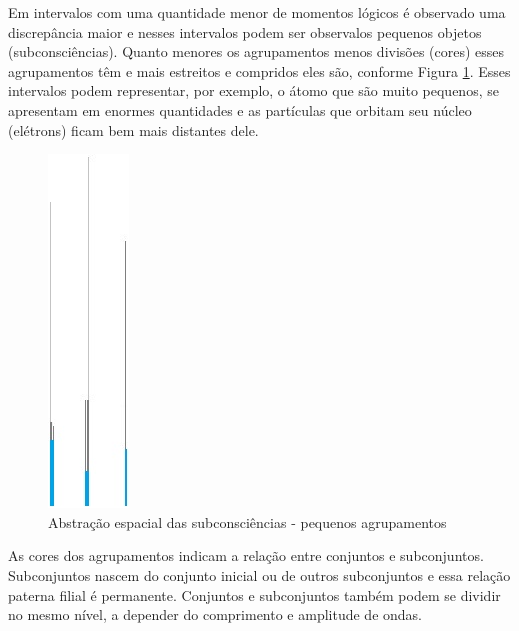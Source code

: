 Em intervalos com uma quantidade menor de momentos lógicos é observado uma discrepância maior e nesses intervalos podem ser observalos pequenos objetos (subconsciências). Quanto menores os agrupamentos menos divisões (cores) esses agrupamentos têm e mais estreitos e compridos eles são, conforme Figura \ref{fig:consciousness_space_subconsciousness_min}. Esses intervalos podem representar, por exemplo, o átomo que são muito pequenos, se apresentam em enormes quantidades e as partículas que orbitam seu núcleo (elétrons) ficam bem mais distantes dele.
	\begin{figure}[H]
	\caption{Abstração espacial das subconsciências - pequenos agrupamentos}
	\label{fig:consciousness_space_subconsciousness_min}
	\centering
	\includegraphics[scale=.7]{sections/images/consciousness_space_subconsciousness_min.jpg}
	\end{figure}
	
As cores dos agrupamentos indicam a relação entre conjuntos e subconjuntos. Subconjuntos nascem do conjunto inicial ou de outros subconjuntos e essa relação paterna filial é permanente. Conjuntos e subconjuntos também podem se dividir no mesmo nível, a depender do comprimento e amplitude de ondas.

